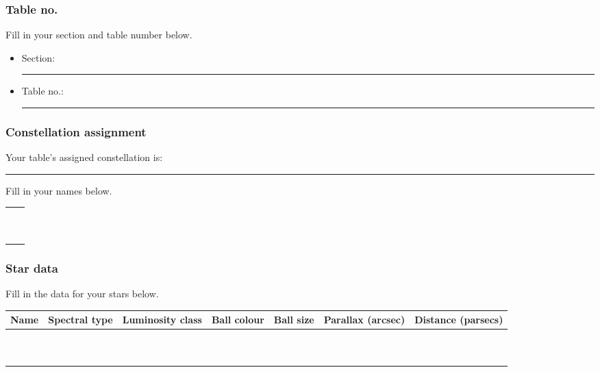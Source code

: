 \documentclass[main.tex]{subfiles}
\begin{document}
\subsubsection{Table no.}
Fill in your section and table number below.
\begin{itemize}
\item Section: \rule{2cm}{.15mm}
\item Table no.: \rule{2cm}{.15mm}
\end{itemize}

\subsubsection{Constellation assignment}
Your table's assigned constellation is: \rule{5cm}{.15mm}

Fill in your names below.

\begin{table}[h!]
\begin{center}
\begin{tabular}{|p{8cm}|p{8cm}|}\hline
&\\
&\\\hline
&\\
&\\\hline
&\\
&\\\hline
&\\
&\\\hline
&\\
&\\\hline
\end{tabular}
\end{center}
\label{tab:name}
\end{table}

\subsubsection{Star data}
Fill in the data for your stars below.

\begin{table}[h!]
\begin{center}
\begin{tabular}{|p{2cm}|p{2cm}|p{2cm}|p{2cm}|p{2cm}|p{2cm}|p{2cm}|}\hline
Name & Spectral type & Luminosity class & Ball colour & Ball size & Parallax (arcsec) & Distance (parsecs) \\\hline
&&&&&&\\\hline
&&&&&&\\\hline
&&&&&&\\\hline
&&&&&&\\\hline
&&&&&&\\\hline
&&&&&&\\\hline
&&&&&&\\\hline
&&&&&&\\\hline
&&&&&&\\\hline
&&&&&&\\\hline
\end{tabular}
\end{center}
\label{tab:star}
\end{table}
\end{document}
